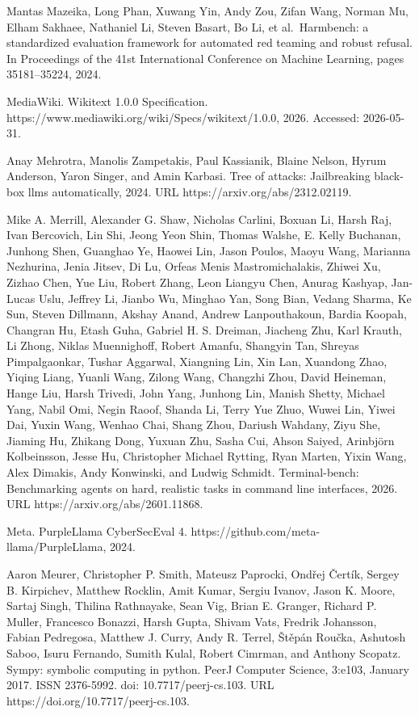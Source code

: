 \documentclass[
  10
]{article}
\begin{document}
Mantas Mazeika, Long Phan, Xuwang Yin, Andy Zou, Zifan Wang, Norman Mu,
Elham Sakhaee, Nathaniel Li, Steven Basart, Bo Li, et al.~Harmbench: a
standardized evaluation framework for automated red teaming and robust
refusal. In Proceedings of the 41st International Conference on Machine
Learning, pages 35181--35224, 2024.



MediaWiki. Wikitext 1.0.0 Specification.
https://www.mediawiki.org/wiki/Specs/wikitext/1.0.0, 2026. Accessed:
2026-05-31.

Anay Mehrotra, Manolis Zampetakis, Paul Kassianik, Blaine Nelson, Hyrum
Anderson, Yaron Singer, and Amin Karbasi. Tree of attacks: Jailbreaking
black-box llms automatically, 2024. URL https://arxiv.org/abs/2312.02119.

Mike A. Merrill, Alexander G. Shaw, Nicholas Carlini, Boxuan Li, Harsh
Raj, Ivan Bercovich, Lin Shi, Jeong Yeon Shin, Thomas Walshe, E. Kelly
Buchanan, Junhong Shen, Guanghao Ye, Haowei Lin, Jason Poulos, Maoyu
Wang, Marianna Nezhurina, Jenia Jitsev, Di Lu, Orfeas Menis
Mastromichalakis, Zhiwei Xu, Zizhao Chen, Yue Liu, Robert Zhang, Leon
Liangyu Chen, Anurag Kashyap, Jan-Lucas Uslu, Jeffrey Li, Jianbo Wu,
Minghao Yan, Song Bian, Vedang Sharma, Ke Sun, Steven Dillmann, Akshay
Anand, Andrew Lanpouthakoun, Bardia Koopah, Changran Hu, Etash Guha,
Gabriel H. S. Dreiman, Jiacheng Zhu, Karl Krauth, Li Zhong, Niklas
Muennighoff, Robert Amanfu, Shangyin Tan, Shreyas Pimpalgaonkar, Tushar
Aggarwal, Xiangning Lin, Xin Lan, Xuandong Zhao, Yiqing Liang, Yuanli
Wang, Zilong Wang, Changzhi Zhou, David Heineman, Hange Liu, Harsh
Trivedi, John Yang, Junhong Lin, Manish Shetty, Michael Yang, Nabil Omi,
Negin Raoof, Shanda Li, Terry Yue Zhuo, Wuwei Lin, Yiwei Dai, Yuxin
Wang, Wenhao Chai, Shang Zhou, Dariush Wahdany, Ziyu She, Jiaming Hu,
Zhikang Dong, Yuxuan Zhu, Sasha Cui, Ahson Saiyed, Arinbjörn
Kolbeinsson, Jesse Hu, Christopher Michael Rytting, Ryan Marten, Yixin
Wang, Alex Dimakis, Andy Konwinski, and Ludwig Schmidt. Terminal-bench:
Benchmarking agents on hard, realistic tasks in command line interfaces,
2026. URL https://arxiv.org/abs/2601.11868.

Meta. PurpleLlama CyberSecEval 4.
https://github.com/meta-llama/PurpleLlama, 2024.

Aaron Meurer, Christopher P. Smith, Mateusz Paprocki, Ondřej Čertík,
Sergey B. Kirpichev, Matthew Rocklin, Amit Kumar, Sergiu Ivanov, Jason
K. Moore, Sartaj Singh, Thilina Rathnayake, Sean Vig, Brian E. Granger,
Richard P. Muller, Francesco Bonazzi, Harsh Gupta, Shivam Vats, Fredrik
Johansson, Fabian Pedregosa, Matthew J. Curry, Andy R. Terrel, Štěpán
Roučka, Ashutosh Saboo, Isuru Fernando, Sumith Kulal, Robert Cimrman,
and Anthony Scopatz. Sympy: symbolic computing in python. PeerJ Computer
Science, 3:e103, January 2017. ISSN 2376-5992. doi:
10.7717/peerj-cs.103. URL https://doi.org/10.7717/peerj-cs.103.
\end{document}
